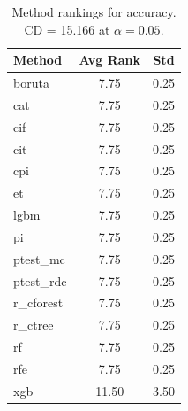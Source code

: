 \begin{table}[h]
\centering
\caption{Method rankings for accuracy. CD = 15.166 at $\alpha=0.05$.}
\label{tab:ranks_accuracy}
\begin{tabular}{lcc}
\toprule
Method & Avg Rank & Std \\
\midrule
boruta & 7.75 & 0.25 \\
cat & 7.75 & 0.25 \\
cif & 7.75 & 0.25 \\
cit & 7.75 & 0.25 \\
cpi & 7.75 & 0.25 \\
et & 7.75 & 0.25 \\
lgbm & 7.75 & 0.25 \\
pi & 7.75 & 0.25 \\
ptest_mc & 7.75 & 0.25 \\
ptest_rdc & 7.75 & 0.25 \\
r_cforest & 7.75 & 0.25 \\
r_ctree & 7.75 & 0.25 \\
rf & 7.75 & 0.25 \\
rfe & 7.75 & 0.25 \\
xgb & 11.50 & 3.50 \\
\bottomrule
\end{tabular}
\end{table}